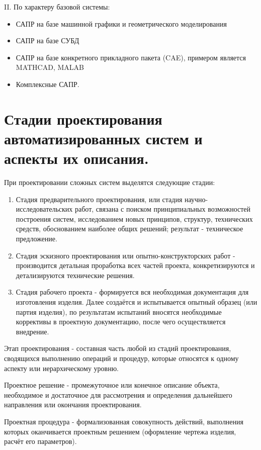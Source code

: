 \documentclass[unicode, 12pt, a4paper, oneside]{article}
\begin{document}
II. По характеру базовой системы:
\begin{itemize}
\item САПР на базе машинной графики и геометрического моделирования
\item САПР на базе СУБД
\item САПР на базе конкретного прикладного пакета (CAE), примером является MATHCAD, MALAB
\item Комплексные САПР.
\end{itemize}

\section{Стадии проектирования автоматизированных систем и аспекты их описания.}

При проектировании сложных систем выделятся следующие стадии:

\begin{enumerate}
\item Стадия предварительного проектирования, или стадия научно-исследовательских работ, связана с поиском принципиальных возможностей построения систем, исследованием новых принципов, структур, технических средств, обоснованием наиболее общих решений; результат - техническое предложение.
\item Стадия эскизного проектирования или опытно-конструкторских работ - производится детальная проработка всех частей проекта, конкретизируются и детализируются  технические решения. 
\item Стадия рабочего проекта - формируется вся необходимая документация для изготовления изделия. Далее создаётся и испытывается опытный образец (или партия изделия), по результатам испытаний вносятся необходимые коррективы в проектную документацию, после чего осуществляется внедрение. 
\end{enumerate}
 
Этап проектирования - составная часть любой из стадий  проектирования, сводящихся выполнению операций и процедур, которые относятся к одному аспекту или иерархическому уровню. 

Проектное решение - промежуточное или конечное описание объекта, необходимое и достаточное для рассмотрения и определения дальнейшего направления или окончания проектирования. 

Проектная процедура - формализованная совокупность действий, выполнения которых оканчивается проектным решением (оформление чертежа изделия, расчёт его параметров). 
\end{document}
